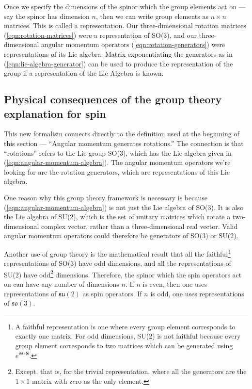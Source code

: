 Once we specify the dimensions of the spinor which the group elements act on --- say the spinor has dimension $n$, then we can write group elements as $n\times n$ matrices. This is called a representation. Our three-dimensional rotation matrices (\ref{eqn:rotation-matrices}) were a representation of SO(3), and our three-dimensional angular momentum operators (\ref{eqn:rotation-generators}) were representations of its Lie algebra. Matrix exponentiating the generators as in (\ref{eqn:lie-algebra-generator}) can be used to produce the representation of the group if a representation of the Lie Algebra is known.

\subsection{Physical consequences of the group theory explanation for spin}

This new formalism connects directly to the definition used at the beginning of this section --- ``Angular momentum generates rotations.'' The connection is that ``rotations'' refers to the Lie group SO(3), which has the Lie algebra given in (\ref{eqn:angular-momentum-algebra}). The angular momentum operators we're looking for are the rotation generators, which are representations of this Lie algebra.

One reason why this group theory framework is necessary is because (\ref{eqn:angular-momentum-algebra}) is not just the Lie algebra of SO(3). It is also the Lie algebra of SU(2), which is the set of unitary matrices which rotate a two-dimensional complex vector, rather than a three-dimensional real vector. Valid angular momentum operators could therefore be generators of SO(3) or SU(2).

Another use of group theory is the mathematical result that all the faithful\footnote{A faithful representation is one where every group element corresponds to exactly one matrix. For odd dimensions, SU(2) is not faithful because every group element corresponds to two matrices which can be generated using $e^{i\bm \theta \cdot \bm S}$.} representations of SO(3) have odd dimensions, and all the representations of SU(2) have odd\footnote{Except, that is, for the trivial representation, where all the generators are the $1\times 1$ matrix with zero as the only element.} dimensions. Therefore, the spinor which the spin operators act on can have any number of dimensions $n$. If $n$ is even, then one uses representations of $\mathfrak{su}(2)$ as spin operators. If $n$ is odd, one uses representations of $\mathfrak{so}(3)$.

